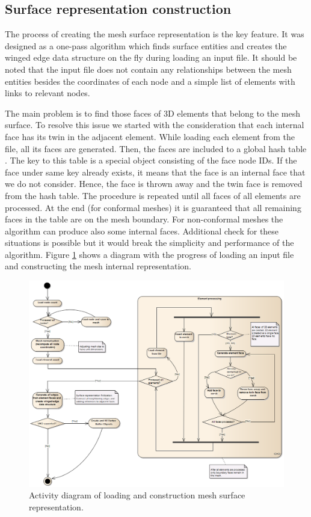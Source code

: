 \subsection{Surface representation construction}

The process of creating the mesh surface representation is the key feature. It was designed as a one-pass algorithm which finds surface entities and creates the winged edge data structure on the fly during loading an input file. It should be noted that the input file does not contain any relationships between the mesh entities besides the coordinates of each node and a simple list of elements with links to relevant nodes.

The main problem is to find those faces of 3D elements that belong to the mesh surface. To resolve this issue we started with the consideration that each internal face has its twin in the adjacent element. While loading each element from the file, all its faces are generated. Then, the faces are included to a global hash table \cite{XXX-7}. The key to this table is a special object consisting of the face node IDs. If the face under same key already exists, it means that the face is an internal face that we do not consider. Hence, the face is thrown away and the twin face is removed from the hash table. The procedure is repeated until all faces of all elements are processed. At the end (for conformal meshes) it is guaranteed that all remaining faces in the table are on the mesh boundary. For non-conformal meshes the algorithm can produce also some internal faces. Additional check for these situations is possible but it would break the simplicity and performance of the algorithm. Figure \ref{fig:mesh-construction} shows a diagram with the progress of loading an input file and constructing the mesh internal representation.

\begin{figure}[H]
\centering
\includegraphics[width=\textwidth]{figures/appendix-mesh-visualization/figure6}
\decoRule
\caption[Activity diagram of mesh construction]{Activity diagram of loading and construction mesh surface representation.}
\label{fig:mesh-construction}
\end{figure}

